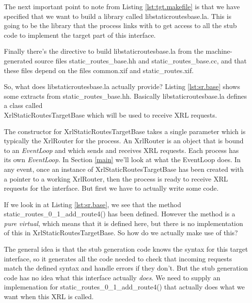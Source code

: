 \documentclass[11pt]{article}
\begin{document}
The next important point to note from Listing \ref{lst:tgt.makefile}
is that we have specified that we want to build a library called {\stt
libstaticroutesbase.la}.  This is going to be the library that the \SRI
process links with to get access to all the stub code to implement
the target part of this interface.

Finally there's the directive to build {\stt libstaticroutesbase.la}
from the machine-generated source files {\stt static\_routes\_base.hh}
and {\stt static\_routes\_base.cc}, and that these files depend on the
files {\stt common.xif} and {\stt static\_routes.xif}.

\vspace{0.1in}
So, what does {\stt libstaticroutesbase.la} actually provide?  Listing
\ref{lst:sr.base} shows some extracts from {\stt
static\_routes\_base.hh}.
Basically {\stt libstaticroutesbase.la} defines a class called \\
{\stt
XrlStaticRoutesTargetBase} which will be used to receive XRL requests.

The constructor for {\stt XrlStaticRoutesTargetBase} takes a single
parameter which is typically the {\stt XrlRouter} for the process.  An
{\stt XrlRouter} is an object that is bound to an {\it EventLoop} and
which sends and receives XRL requests.  Each process has its own {\it
EventLoop}.  In Section \ref{main} we'll look at what the EventLoop
does.  In any event, once an instance of {\stt
XrlStaticRoutesTargetBase} has been created with a pointer to a
working {\stt XrlRouter}, then the process is ready to receive XRL
requests for the \SR interface.  But first we have to actually write
some code.

If we look in at Listing \ref{lst:sr.base}, we see that the method
{\stt static\_routes\_0\_1\_add\_route4()} has been defined.  However the
method is a {\it pure virtual}, which means that it is defined here,
but there is no implementation of this in {\stt
XrlStaticRoutesTargetBase}.  So how do we actually make use of this?

The general idea is that the stub generation code knows the syntax for
this target interface, so it generates all the code needed to check
that incoming requests match the defined syntax and handle errors if
they don't.  But the stub generation code has no idea what this
interface actually {\it does}.  We need to supply an implemenation for {\stt
static\_routes\_0\_1\_add\_route4()} that actually does what we want when
this XRL is called.

\newpage
\end{document}
